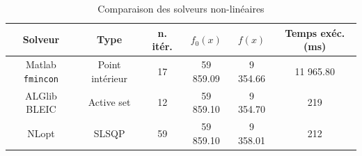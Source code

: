\begin{table}[htp]
	\centering
	\begin{tabular}{ |c|c|c|c|c|c| } 
 \hline
 Solveur & Type & n. itér. & $f_0(x)$ & $f(x)$ & Temps exéc. (ms) \\ 
 \hline
	Matlab \texttt{fmincon} & Point intérieur& 17& 59 859.09 & 9 354.66 & 11 965.80\\
	ALGlib BLEIC & Active set & 12 & 59 859.10 & 9 354.70 & 219\\
	NLopt & SLSQP& 59 & 59 859.10 & 9 358.01 & 212\\
	\hline
\end{tabular}
	\caption{Comparaison des solveurs non-linéaires}
	\label{table:nl_comparison}
\end{table}

